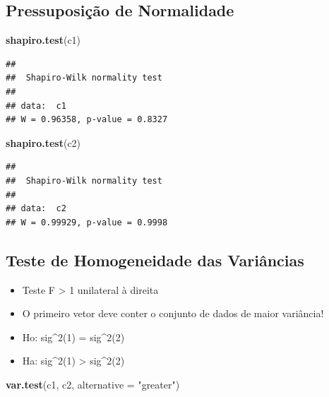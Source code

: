 \documentclass[
]{book}
\newenvironment{Shaded}{\begin{snugshade}}{\end{snugshade}}
\newcommand{\AttributeTok}[1]{\textcolor[rgb]{0.13,0.29,0.53}{#1}}
\newcommand{\FunctionTok}[1]{\textcolor[rgb]{0.13,0.29,0.53}{\textbf{#1}}}
\newcommand{\NormalTok}[1]{#1}
\newcommand{\StringTok}[1]{\textcolor[rgb]{0.31,0.60,0.02}{#1}}
\providecommand{\tightlist}{%
  \setlength{\itemsep}{0pt}\setlength{\parskip}{0pt}}
\begin{document}
\subsection{Pressuposição de Normalidade}\label{pressuposiuxe7uxe3o-de-normalidade}

\begin{Shaded}
\begin{Highlighting}[]
\FunctionTok{shapiro.test}\NormalTok{(c1)}
\end{Highlighting}
\end{Shaded}

\begin{verbatim}
## 
##  Shapiro-Wilk normality test
## 
## data:  c1
## W = 0.96358, p-value = 0.8327
\end{verbatim}

\begin{Shaded}
\begin{Highlighting}[]
\FunctionTok{shapiro.test}\NormalTok{(c2)}
\end{Highlighting}
\end{Shaded}

\begin{verbatim}
## 
##  Shapiro-Wilk normality test
## 
## data:  c2
## W = 0.99929, p-value = 0.9998
\end{verbatim}

\subsection{Teste de Homogeneidade das Variâncias}\label{teste-de-homogeneidade-das-variuxe2ncias}

\begin{itemize}
\tightlist
\item
  Teste F \textgreater{} 1 unilateral à direita
\item
  O primeiro vetor deve conter o conjunto de dados de maior variância!
\item
  Ho: sig\^{}2(1) = sig\^{}2(2)
\item
  Ha: sig\^{}2(1) \textgreater{} sig\^{}2(2)
\end{itemize}

\begin{Shaded}
\begin{Highlighting}[]
\FunctionTok{var.test}\NormalTok{(c1, c2, }\AttributeTok{alternative =} \StringTok{"greater"}\NormalTok{)}
\end{Highlighting}
\end{Shaded}
\end{document}
